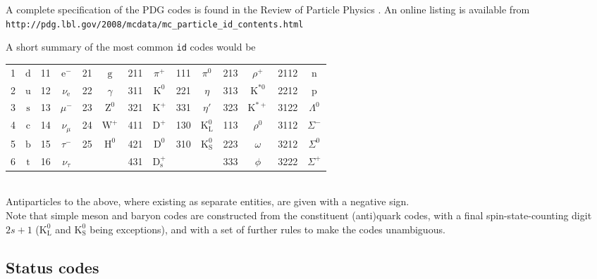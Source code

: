\documentclass[12pt,a4paper]{article}
\newcommand{\mrm}[1]{\mathrm{#1}}
\renewcommand{\b}{{\mathrm b}}
\renewcommand{\c}{{\mathrm c}}
\renewcommand{\d}{{\mathrm d}}
\newcommand{\e}{{\mathrm e}}
\newcommand{\g}{{\mathrm g}}
\newcommand{\n}{{\mathrm n}}
\newcommand{\p}{{\mathrm p}}
\newcommand{\s}{{\mathrm s}}
\renewcommand{\t}{{\mathrm t}}
\renewcommand{\u}{{\mathrm u}}
\newcommand{\D}{{\mathrm D}}
\renewcommand{\H}{{\mathrm H}}
\newcommand{\K}{{\mathrm K}}
\newcommand{\W}{{\mathrm W}}
\newcommand{\Z}{{\mathrm Z}}
\begin{document}
A complete specification of the PDG codes is found in the
Review of Particle Physics \cite{rpp}. An online listing is 
available from\\
\hspace*{10mm}\texttt{http://pdg.lbl.gov/2008/mcdata/mc\_particle\_id\_contents.html}

A short summary of the most common \texttt{id} codes would be\\[2mm] 
\begin{tabular}{|cc|cc|cc|cc|cc|cc|cc|}
\hline
1 & $\d$ & 11 & $\e^-$      & 21  & $\g$ & 211 & $\pi^+$ 
& 111 & $\pi^0$ & 213 & $\rho^+$ & 2112 & $\n$ \\
2 & $\u$ & 12 & $\nu_{\e}$   & 22 & $\gamma$ & 311 & $\K^0$
& 221 & $\eta$ & 313 & $\K^{*0}$ & 2212 & $\p$  \\
3 & $\s$ & 13 & $\mu^-$     & 23 & $\Z^0$  & 321 & $\K^+$
& 331 & $\eta'$ & 323 & $\K^{*+}$ & 3122 & $\Lambda^0$ \\
4 & $\c$ & 14 & $\nu_{\mu}$  & 24 & $\W^+$ & 411 & $\D^+$
& 130 & $\K^0_{\mrm{L}}$ & 113 & $\rho^0$ & 3112 & $\Sigma^-$ \\
5 & $\b$ & 15 & $\tau^-$    & 25 & $\H^0$ & 421 & $\D^0$
& 310 & $\K^0_{\mrm{S}}$ & 223 & $\omega$ & 3212 & $\Sigma^0$  \\
6 & $\t$ & 16 & $\nu_{\tau}$ &  &  & 431 & $\D_{\s}^+$
& & & 333 & $\phi$ & 3222 & $\Sigma^+$ \\
\hline
\end{tabular}\\[2mm]
Antiparticles to the above, where existing as separate entities, 
are given with a negative sign.\\
Note that simple meson and baryon codes are constructed from 
the constituent (anti)quark codes, with a final spin-state-counting digit 
$2 s + 1$ ($\K^0_{\mrm{L}}$ and $\K^0_{\mrm{S}}$ being exceptions), and with
a set of further rules to make the codes unambiguous.  

\subsection{Status codes}
\end{document}
